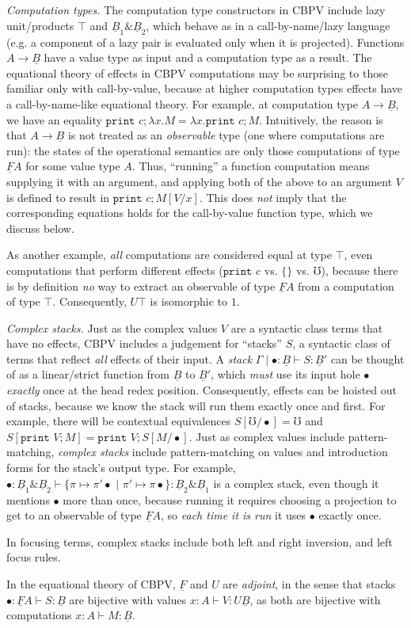 \documentclass[acmsmall,screen,12pt]{acmart}
\renewcommand{\u}{\underline}
\newcommand{\pipe}{\,\,|\,\,}
\newcommand{\pair}[2]{\{ \pi \mapsto {#1} \pipe \pi' \mapsto {#2}\}}
\newcommand{\err}{\mho}
\newcommand{\print}{\kw{print}}
\newcommand{\kw}[1]{\texttt{#1}\,\,}
\newcommand{\with}{\mathbin{\&}}
\begin{document}
\emph{Computation types.}
The computation type constructors in CBPV include lazy unit/products
$\top$ and $\u B_1 \with \u B_2$, which behave as in a call-by-name/lazy
language (e.g. a component of a lazy pair is evaluated only when it is
projected).  Functions $A \to \u B$ have a value type as input and a
computation type as a result.  The equational theory of effects in CBPV
computations may be surprising to those familiar only with
call-by-value, because at higher computation types effects have a
call-by-name-like equational theory.  For example, at computation type
$A \to \u B$, we have an equality $\print c; \lambda x. M = \lambda
x.\print c; M$.  Intuitively, the reason is that $A \to \u B$ is not
treated as an \emph{observable} type (one where computations are run):
the states of the operational semantics are only those computations of
type $\u F A$ for some value type $A$.  Thus, ``running'' a function
computation means supplying it with an argument, and applying both of
the above to an argument $V$ is defined to result in $\print c;M[V/x]$.
This does \emph{not} imply that the corresponding equations holds for
the call-by-value function type, which we discuss below.
\begin{longonly}
As another
example, \emph{all} computations are considered equal at type $\top$,
even computations that perform different effects ($\print c$ vs. $\{\}$
vs. $\err$), because there is by definition \emph{no} way to extract an
observable of type $\u F A$ from a computation of type $\top$.
Consequently, $U \top$ is isomorphic to $1$.
\end{longonly}

\emph{Complex stacks.} Just as the complex values $V$ are a syntactic
class terms that have no effects, CBPV includes a judgement for
``stacks'' $S$, a syntactic class of terms that reflect \emph{all}
effects of their input.  A \emph{stack} $\Gamma \mid \bullet : \u B
\vdash S : \u B'$ can be thought of as a linear/strict function from $\u
B$ to $\u B'$, which \emph{must} use its input hole $\bullet$
\emph{exactly} once at the head redex position.  Consequently, effects
can be hoisted out of stacks, because we know the stack will run them
exactly once and first.  For example, there will be contextual
equivalences $S[\err/\bullet] = \err$ and $S[\print V;M] = \print
V;S[M/\bullet]$.  Just as complex values include pattern-matching,
\emph{complex stacks} include pattern-matching on values and
introduction forms for the stack's output type.  For example, $\bullet :
\u B_1 \with \u B_2 \vdash \pair{\pi' \bullet}{\pi \bullet} : \u B_2
\with \u B_1$ is a complex stack, even though it mentions $\bullet$ more
than once, because running it requires choosing a projection to get to
an observable of type $\u F A$, so \emph{each time it is run} it uses
$\bullet$ exactly once.
\begin{longonly}
In
focusing terms, complex stacks include both left and right inversion,
and left focus rules.
\end{longonly}
In the equational theory of CBPV, $\u F$ and $U$
are \emph{adjoint}, in the sense that stacks $\bullet : \u F A \vdash S
: \u B$ are bijective with values $x : A \vdash V : U \u B$, as both are
bijective with computations $x : A \vdash M : \u B$.
\end{document}
